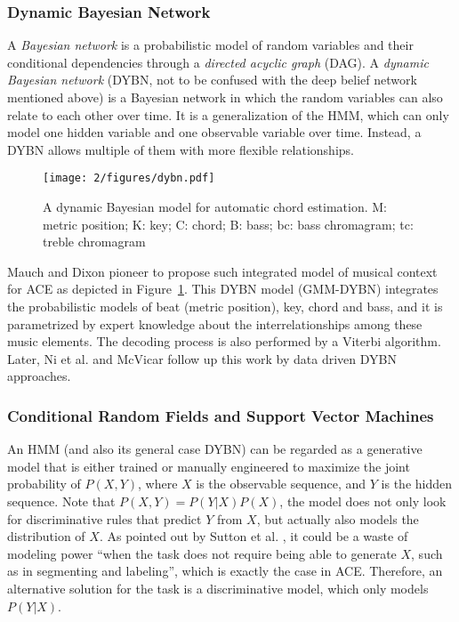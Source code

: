 \subsubsection{Dynamic Bayesian Network}
A {\it Bayesian network} \cite{pearl2014probabilistic} is a probabilistic model of random variables and their conditional dependencies through a {\it directed acyclic graph} (DAG). A {\it dynamic Bayesian network} \cite{murphy2002dynamic} (DYBN, not to be confused with the deep belief network mentioned above) is a Bayesian network in which the random variables can also relate to each other over time. It is a generalization of the HMM, which can only model one hidden variable and one observable variable over time. Instead, a DYBN allows multiple of them with more flexible relationships.

\begin{figure}[htb]
\centering
\texttt{[image: 2/figures/dybn.pdf]}
\caption{A dynamic Bayesian model for automatic chord estimation. M: metric position; K: key; C: chord; B: bass; bc: bass chromagram; tc: treble chromagram}
\label{fig:2-dybn}
\end{figure}
Mauch and Dixon \cite{mauch2010approximate} pioneer to propose such integrated model of musical context for ACE as depicted in Figure~\ref{fig:2-dybn}. This DYBN model (GMM-DYBN) integrates the probabilistic models of beat (metric position), key, chord and bass, and it is parametrized by expert knowledge about the interrelationships among these music elements. The decoding process is also performed by a Viterbi algorithm. Later, Ni et al. \cite{ni2012end} and McVicar \cite{mcvicar2013machine} follow up this work by data driven DYBN approaches.

\subsubsection{Conditional Random Fields and Support Vector Machines}
An HMM (and also its general case DYBN) can be regarded as a generative model that is either trained or manually engineered to maximize the joint probability of $P(X,Y)$, where $X$ is the observable sequence, and $Y$ is the hidden sequence. Note that $P(X,Y) = P(Y|X)P(X)$, the model does not only look for discriminative rules that predict $Y$ from $X$, but actually also models the distribution of $X$. As pointed out by Sutton et al. \cite{sutton2007dynamic}, it could be a waste of modeling power ``when the task does not require being able to generate $X$, such as in segmenting and labeling'', which is exactly the case in ACE. Therefore, an alternative solution for the task is a discriminative model, which only models $P(Y|X)$.

